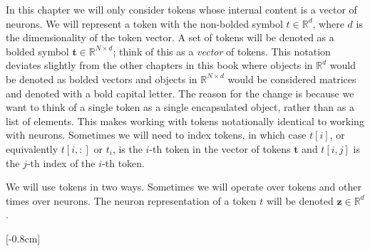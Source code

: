 In this chapter we will only consider tokens whose internal content is a vector of neurons. 
We will represent a token with the non-bolded symbol $t \in \mathbb{R}^d$, where $d$ is the dimensionality of the token vector. A set of tokens will be denoted as a bolded symbol $\mathbf{t} \in \mathbb{R}^{N \times d}$; think of this as a \textit{vector} of tokens. This notation deviates slightly from the other chapters in this book where objects in $\mathbb{R}^d$ would be denoted as bolded vectors and objects in $\mathbb{R}^{N \times d}$ would be considered matrices and denoted with a bold capital letter. The reason for the change is because we want to think of a single token as a single encapsulated object, rather than as a list of elements. This makes working with tokens notationally identical to working with neurons. Sometimes we will need to index tokens, in which case $t[i]$, or equivalently $t[i,:]$ or $t_i$, is the $i$-th token in the vector of tokens $\mathbf{t}$ and $t[i,j]$ is the $j$-th index of the $i$-th token. %

We will use tokens in two ways. Sometimes we will operate over tokens and other times over neurons. The neuron representation of a token $t$ will be denoted $\mathbf{z} \in \mathbb{R}^d$.  

[-0.8cm] 

